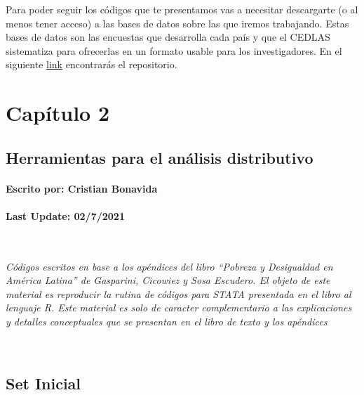 \documentclass[
]{book}
\begin{document}
Para poder seguir los códigos que te presentamos vas a necesitar descargarte (o al menos tener acceso) a las bases de datos sobre las que iremos trabajando. Estas bases de datos son las encuestas que desarrolla cada país y que el CEDLAS sistematiza para ofrecerlas en un formato usable para los investigadores. En el siguiente \href{https://www.cedlas.econo.unlp.edu.ar/wp/publicaciones/libros/pobreza-y-desigualdad-en-america-latina/\#1505501369949-15c93bca-b4f8}{link} encontrarás el repositorio.

\hypertarget{capuxedtulo-2}{%
\chapter{Capítulo 2}\label{capuxedtulo-2}}

\hypertarget{herramientas-para-el-anuxe1lisis-distributivo}{%
\section*{Herramientas para el análisis distributivo}\label{herramientas-para-el-anuxe1lisis-distributivo}}

\hypertarget{escrito-por-cristian-bonavida}{%
\subsubsection*{Escrito por: Cristian Bonavida}\label{escrito-por-cristian-bonavida}}

\hypertarget{last-update-0272021}{%
\subsubsection*{Last Update: 02/7/2021}\label{last-update-0272021}}

~

\emph{Códigos escritos en base a los apéndices del libro ``Pobreza y Desigualdad en América Latina'' de Gasparini, Cicowiez y Sosa Escudero. El objeto de este material es reproducir la rutina de códigos para STATA presentada en el libro al lenguaje R. Este material es solo de caracter complementario a las explicaciones y detalles conceptuales que se presentan en el libro de texto y los apéndices}

~

\hypertarget{set-inicial}{%
\section*{Set Inicial}\label{set-inicial}}
\end{document}
